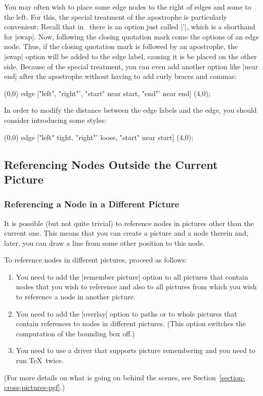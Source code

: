 You may often wish to place some edge nodes to the right of edges and some to
the left. For this, the special treatment of the apostrophe is particularly
convenient: Recall that in \tikzname\ there is an option just called |'|, which
is a shorthand for |swap|. Now, following the closing quotation mark come the
options of an edge node. Thus, if the closing quotation mark is followed by an
apostrophe, the |swap| option will be added to the edge label, causing it is be
placed on the other side. Because of the special treatment, you can even add
another option like |near end| after the apostrophe without having to add curly
braces and commas:
%
\begin{codeexample}[preamble={\usetikzlibrary{quotes}}]
\tikz
  \draw (0,0) edge ["left", "right"',
                    "start" near start,
                    "end"' near end] (4,0);
\end{codeexample}

In order to modify the distance between the edge labels and the edge, you
should consider introducing some styles:
%
\begin{codeexample}[preamble={\usetikzlibrary{quotes}}]
\tikz [tight/.style={inner sep=1pt}, loose/.style={inner sep=.7em}]
  \draw (0,0) edge ["left"   tight,
                    "right"' loose,
                    "start"  near start] (4,0);
\end{codeexample}


\subsection{Referencing Nodes Outside the Current Picture}
\label{section-cross-picture-tikz}

\subsubsection{Referencing a Node in a Different Picture}

It is possible (but not quite trivial) to reference nodes in pictures other
than the current one. This means that you can create a picture and a node
therein and, later, you can draw a line from some other position to this node.

To reference nodes in different pictures, proceed as follows:
%
\begin{enumerate}
    \item You need to add the |remember picture| option to all pictures that
        contain nodes that you wish to reference and also to all pictures from
        which you wish to reference a node in another picture.
    \item You need to add the |overlay| option to paths or to whole pictures
        that contain references to nodes in different pictures. (This option
        switches the computation of the bounding box off.)
    \item You need to use a driver that supports picture remembering and you
        need to run \TeX\ twice.
\end{enumerate}
%
(For more details on what is going on behind the scenes, see
Section~\ref{section-cross-pictures-pgf}.)


